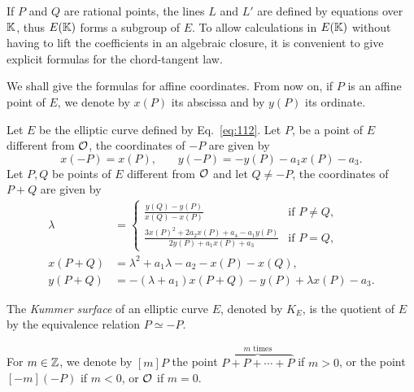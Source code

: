 If $P$ and $Q$ are rational points, the lines $L$ and $L'$ are defined
by equations over $\mathbb{K}$, thus $E(\mathbb{K})$ forms a subgroup of $E$. To allow
calculations in $E(\mathbb{K})$ without having to lift the coefficients in an
algebraic closure, it is convenient to give explicit formulas for the
chord-tangent law. 

We shall give the formulas for affine coordinates. From now on, if $P$
is an affine point of $E$, we denote by $x(P)$ its abscissa and by
$y(P)$ its ordinate.

\begin{proposition}
  Let $E$ be the elliptic curve defined by Eq.~\eqref{eq:112}. Let
  $P$, be a point of $E$ different from $\mathcal{O}$, the coordinates of $-P$
  are given by
  \begin{equation}
    \label{eq:120}
    x(-P) = x(P)\text{,}\qquad y(-P)=-y(P) -a_1x(P) - a_3
    \text{.}
  \end{equation}
  Let $P,Q$ be points of $E$ different from $\mathcal{O}$ and let $Q\ne-P$, the
  coordinates of $P+Q$ are given by
  \begin{equation}
    \label{eq:121}
    \begin{aligned}
      \lambda &= \begin{cases}
        \frac{y(Q) - y(P)}{x(Q) -x(P)} &\text{if $P\ne Q$,}\\
        \frac{3x(P)^2+2a_2x(P)+a_4-a_1y(P)}{2y(P)+a_1x(P)+a_3} &\text{if $P=Q$,}
      \end{cases}\\
      x(P+Q) &= \lambda^2+a_1\lambda-a_2-x(P)-x(Q)\text{,}\\
      y(P+Q) &= -(\lambda+a_1)x(P+Q) - y(P) + \lambda x(P)-a_3\text{.}
    \end{aligned}
  \end{equation}
\end{proposition}

\begin{definition}
  The \emph{Kummer surface} of an elliptic curve
  $E$, denoted by $K_E$, is the quotient of $E$ by the equivalence
  relation $P\simeq-P$.
\end{definition}

For $m\in\mathbb{Z}$, we denote by $[m]P$ the point%
 $\overbrace{P+P+\cdots+P}^{m\text{ times}}$ if $m>0$, or the
point $[-m](-P)$ if $m<0$, or $\mathcal{O}$ if $m=0$. 

